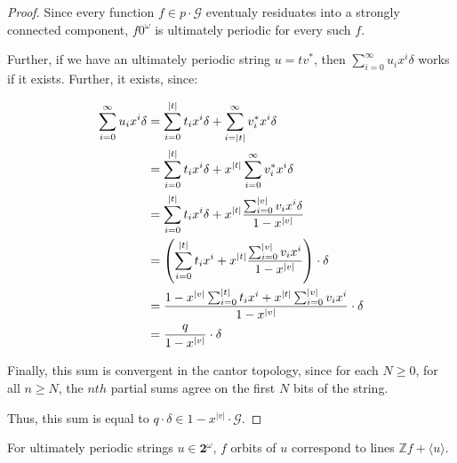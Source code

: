 \documentclass[12pt]{article}
\newcommand{\G}{\mathcal{G}}
\newcommand{\Z}{\mathbb{Z}}
\newcommand{\2}{\textbf{2}}
\begin{document}
\begin{proof}
  Since every function $f \in p \cdot \G$ eventualy residuates into a 
  strongly connected component, $f 0^\omega$ is ultimately periodic for
  every such $f$.

  Further, if we have an ultimately periodic string $u = tv^*$, then
  $\sum_{i=0}^{\infty} u_i x^i \delta$ works if it exists. Further,
  it exists, since:

  \begin{align*}
    \sum_{i=0}^{\infty} u_i x^i \delta 
    &= \sum_{i=0}^{|t|} t_i x^i \delta 
        + \sum_{i=|t|}^{\infty} v^*_i x^i \delta\\
    &= \sum_{i=0}^{|t|} t_i x^i \delta 
        + x^{|t|} \sum_{i=0}^{\infty} v^*_i x^i \delta\\
    &= \sum_{i=0}^{|t|} t_i x^i \delta 
         + x^{|t|} \frac{\sum_{i=0}^{|v|} v_i x^i \delta}{1 - x^{|v|}}\\
    &= \left ( 
        \sum_{i=0}^{|t|} t_i x^i
        + x^{|t|} \frac{\sum_{i=0}^{|v|} v_i x^i}{1 - x^{|v|}}
       \right ) \cdot \delta\\
    &= \frac%
        {%
          1 - x^{|v|} \sum_{i=0}^{|t|} t_i x^i + 
          x^{|t|} \sum_{i=0}^{|v|} v_i x^i
        }
        {1 - x^{|v|}}
       \cdot \delta\\
    &= \frac{q}{1 - x^{|v|}} \cdot \delta
  \end{align*}

  Finally, this sum is convergent in the cantor topology, since 
  for each $N \geq 0$, for all $n \geq N$, the $nth$ partial sums 
  agree on the first $N$ bits of the string.

  Thus, this sum is equal to $q \cdot \delta \in 1 - x^{|v|} \cdot \G$.
\end{proof}

For ultimately periodic strings $u \in \2^\omega$, $f$ orbits
of $u$ correspond to lines $\Z f + \langle u \rangle$.
\end{document}
